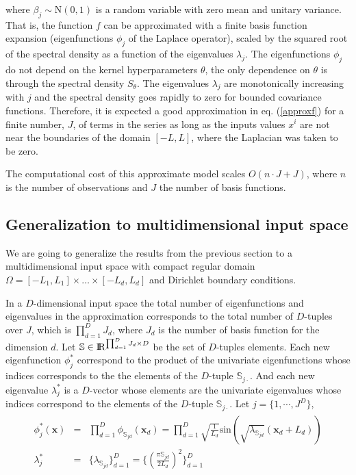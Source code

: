 \documentclass[]{interact}
\theoremstyle{plain}%
\theoremstyle{definition}
\theoremstyle{remark}
\begin{document}
\noindent where $\beta_j \sim \text{N}(0,1)$ is a random variable with zero mean and unitary variance. That is, the function $f$ can be approximated with a finite basis function expansion (eigenfunctions $\phi_j$ of the Laplace operator), scaled by the squared root of the spectral density as a function of the eigenvalues $\lambda_j$. The eigenfunctions $\phi_j$ do not depend on the kernel hyperparameters $\theta$, the only dependence on $\theta$ is through the spectral density $S_{\theta}$. The eigenvalues $\lambda_j$ are monotonically increasing with $j$ and the spectral density goes rapidly to zero for bounded covariance functions. Therefore, it is expected a good approximation in eq. (\ref{approxf}) for a finite number, $J$, of terms in the series as long as the inputs values $x^i$ are not near the boundaries of the domain $[-L,L]$, where the Laplacian was taken to be zero.

The computational cost of this approximate model scales $O(n\cdot J+J)$, where $n$ is the number of observations and $J$ the number of basis functions.



\subsection{Generalization to multidimensional input space}

We are going to generalize the results from the previous section to a multidimensional input space with compact regular domain $\Omega=[-L_1,L_1] \times \dots \times [-L_d,L_d]$ and Dirichlet boundary conditions.  

\vspace{0.2cm}
In a $D$-dimensional input space the total number of eigenfunctions and eigenvalues in the approximation corresponds to the total number of $D$-tuples over $J$, which is $\prod_{d=1}^{D} J_d$, where $J_d$ is the number of basis function for the dimension $d$. Let $\mathbb{S}\in {\rm I\!R}^{\prod_{d=1}^{D} J_d \times D}$ be the set of $D$-tuples elements. Each new eigenfunction $\phi^{\ast}_j$ correspond to the product of the univariate eigenfunctions whose indices corresponds to the the elements of the $D$-tuple $\mathbb{S}_{j\cdotp}$. And each new eigenvalue $\lambda^{\ast}_j$ is a $D$-vector whose elements are the univariate eigenvalues whose indices correspond to the elements of the $D$-tuple $\mathbb{S}_{j\cdotp}$. Let $j=\{1,\cdots,J^D\}$,
%
\begin{eqnarray} \label{bf&lambda_multi}
\begin{split}
\phi^{\ast}_j(\mathbf{x}) &=& \prod_{d=1}^{D} \phi_{\mathbb{S}_{jd}}(\mathbf{x}_d) = \prod_{d=1}^{D} \sqrt{\frac{1}{L_d}} \text{sin}\left(\sqrt{\lambda_{\mathbb{S}_{jd}}}(\mathbf{x}_d+L_d)\right) \\
%
\lambda^{\ast}_j &=& \{\lambda_{\mathbb{S}_{jd}} \}_{d=1}^D =  \{ \left(\tfrac{\pi \mathbb{S}_{jd}}{2L_d}\right)^2 \}_{d=1}^D  
\end{split}
\end{eqnarray}
\end{document}
